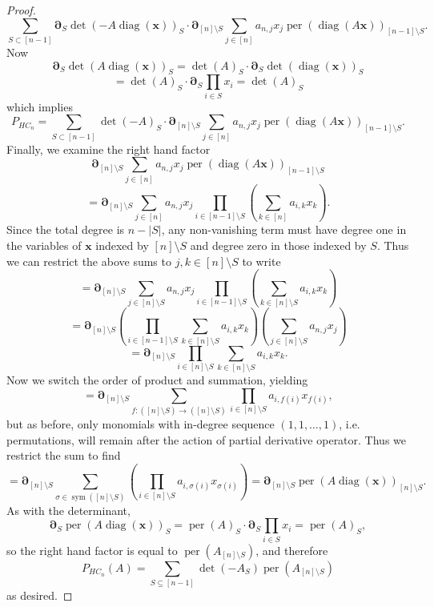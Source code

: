 \documentclass[10pt,a4paper]{amsart}
\newcommand{\diag}{\operatorname{diag}}
\newcommand{\per}{\operatorname{per}}
\newcommand{\sym}{\operatorname{sym}}
\begin{document}
\begin{proof}
    \[
        \sum_{S\subset[n-1]}\boldsymbol{\partial}_{S}\det(-A\diag(\boldsymbol{x}))_S \cdot \boldsymbol{\partial}_{[n]\setminus S}\sum_{j\in[n]}a_{n,j}x_j\per(\diag(A\boldsymbol{x}))_{[n-1]\setminus S}.
    \]
    Now
    \[
        \boldsymbol{\partial}_{S}\det(A\diag(\boldsymbol{x}))_S=\det(A)_S\cdot\boldsymbol{\partial}_S\det(\diag(\boldsymbol{x}))_S
    \]
    \[
        =\det(A)_S\cdot\boldsymbol{\partial}_{S}\prod_{i\in S}x_i=\det(A)_S
    \]
    which implies
    \[
        P_{HC_n}=\sum_{S\subset[n-1]}\det(-A)_S\cdot\boldsymbol{\partial}_{[n]\setminus S}\sum_{j\in[n]}a_{n,j}x_j\per(\diag(A\boldsymbol{x}))_{[n-1]\setminus S}.
    \]
    Finally, we examine the right hand factor
    \[
        \boldsymbol{\partial}_{[n]\setminus S}\sum_{j\in[n]}a_{n,j}x_j\per(\diag(A\boldsymbol{x}))_{[n-1]\setminus S}
    \]
    \[
        =\boldsymbol{\partial}_{[n]\setminus S}\sum_{j\in[n]}a_{n,j}x_j\prod_{i\in[n-1]\setminus S}\left(\sum_{k\in[n]}a_{i,k}x_{k}\right).
    \]
    Since the total degree is $n-|S|$, any non-vanishing term must have degree one in the variables of $\boldsymbol{x}$ indexed by $[n]\setminus S$ and degree zero in those indexed by $S$. Thus we can restrict the above sums to $j,k\in[n]\setminus S$ to write
    \[
        =\boldsymbol{\partial}_{[n]\setminus S}\sum_{j\in[n]\setminus S}a_{n,j}x_j\prod_{i\in[n-1]\setminus S}\left(\sum_{k\in[n]\setminus S}a_{i,k}x_{k}\right)
    \]
    \[
        =\boldsymbol{\partial}_{[n]\setminus S}\left(\prod_{i\in[n-1]\setminus S}\sum_{k\in[n]\setminus S}a_{i,k}x_{k}\right)\left(\sum_{j\in[n]\setminus S}a_{n,j}x_j\right)
    \]
    \[
        =\boldsymbol{\partial}_{[n]\setminus S}\prod_{i\in[n]\setminus S}\sum_{k\in[n]\setminus S}a_{i,k}x_{k}.
    \]
    Now we switch the order of product and summation, yielding
    \[
        =\boldsymbol{\partial}_{[n]\setminus S}\sum_{f:([n]\setminus S)\rightarrow([n]\setminus S)}\prod_{i\in[n]\setminus S}a_{i,f(i)}x_{f(i)},
    \]
    but as before, only monomials with in-degree sequence $(1,1,\hdots,1)$, i.e. permutations, will remain after the action of partial derivative operator. Thus we restrict the sum to find
    \[
        =\boldsymbol{\partial}_{[n]\setminus S}\sum_{\sigma\in\sym([n]\setminus S)}\left(\prod_{i\in[n]\setminus S}a_{i,\sigma(i)}x_{\sigma(i)}\right) =\boldsymbol{\partial}_{[n]\setminus S}\per(A\diag(\boldsymbol{x}))_{[n]\setminus S}.
    \]
    As with the determinant, 
    \[
        \boldsymbol{\partial}_{S}\per(A\diag(\boldsymbol{x}))_S=\per(A)_S\cdot\boldsymbol{\partial}_{S}\prod_{i\in S}x_i=\per(A)_S,
    \]
    so the right hand factor is equal to $\per(A_{[n]\setminus S})$, and therefore
    \[
        P_{HC_n}(A)=\sum_{S\subseteq[n-1]}\det(-A_S)\per(A_{[n]\setminus S})
    \]
    as desired.
\end{proof}
\end{document}
